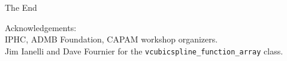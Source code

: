 \documentclass[table]{beamer}
\begin{document}
%
 
 
 
\begin{frame}[t]
\centerline{The End}
Acknowledgements:\\
\vfill 
IPHC, ADMB Foundation, CAPAM workshop organizers.\\
\vfill
Jim Ianelli and Dave Fournier for the \texttt{vcubicspline\_function\_array} class. 
\end{frame}
\end{document}
